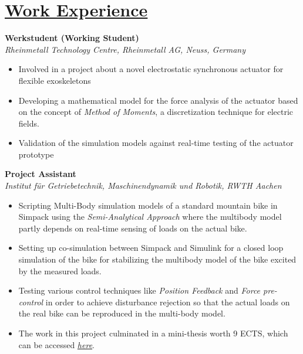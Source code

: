 
\section{\underline{Work Experience}}
\large{\textbf{Werkstudent (Working Student)}}
\hfill
\rheinmetalldate\\
\large{\emph{Rheinmetall Technology Centre, Rheinmetall AG, Neuss, Germany}}
\begin{itemize}
\item\large{Involved in a project about a novel electrostatic synchronous actuator for flexible exoskeletons}
\item\large{Developing a mathematical model for the force analysis of the actuator based on the concept of \emph{Method of Moments}, a discretization technique for electric fields.}
\item\large{Validation of the simulation models against real-time testing of the actuator prototype}
\end{itemize}

\vspace{0.1 in}

\large{\textbf{Project Assistant}}
\hfill
\minithesisdate\\
\emph{\large{Institut für Getriebetechnik, Maschinendynamik und Robotik, RWTH Aachen}}
\begin{itemize}
\item \large{Scripting Multi-Body simulation models of a standard mountain bike in Simpack using the \emph{Semi-Analytical Approach} where the multibody model partly depends on real-time sensing of loads on the actual bike.}
\item\large{Setting up co-simulation between Simpack and Simulink for a closed loop simulation of the bike for stabilizing the multibody model of the bike excited by the measured loads.}
\item\large{Testing various control techniques like \emph{Position Feedback} and \emph{Force pre-control} in order to achieve disturbance rejection so that the actual loads on the real bike can be reproduced in the multi-body model}.
\item\large{The work in this project culminated in a mini-thesis worth 9 ECTS, which can be accessed \href{https://github.com/average-engineer/MiniThesis_IGMR/blob/master/Thesis.pdf}{\large{\textit{here}}}.}
\end{itemize}


